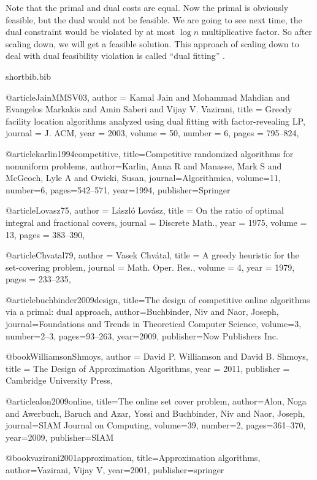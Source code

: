 \documentclass[11pt]{article}
\begin{document}
Note that the primal and dual costs are equal. Now the primal is obviously feasible, but the dual would not be feasible. We are going to see next time, the dual constraint would be violated by at most  $\log n$ multiplicative factor. So after scaling down, we will get a feasible solution. This approach of scaling down to deal with dual feasibility violation is called ``dual fitting'' \cite{JainMMSV03}. 


\begin{filecontents}{shortbib.bib}

@article{JainMMSV03,
  author    = {Kamal Jain and
               Mohammad Mahdian and
               Evangelos Markakis and
               Amin Saberi and
               Vijay V. Vazirani},
  title     = {Greedy facility location algorithms analyzed using dual fitting with
               factor-revealing {LP}},
  journal   = {J. {ACM}},
  year      = {2003},
  volume    = {50},
  number    = {6},
  pages     = {795--824},
}

@article{karlin1994competitive,
  title={Competitive randomized algorithms for nonuniform problems},
  author={Karlin, Anna R and Manasse, Mark S and McGeoch, Lyle A and Owicki, Susan},
  journal={Algorithmica},
  volume={11},
  number={6},
  pages={542--571},
  year={1994},
  publisher={Springer}
}

@article{Lovasz75,
  author    = {L{\'{a}}szl{\'{o}} Lov{\'{a}}sz},
  title     = {On the ratio of optimal integral and fractional covers},
  journal   = {Discrete Math.},
  year      = {1975},
  volume    = {13},
  pages     = {383--390},
}

@article{Chvatal79,
  author = {Vasek Chv\'{a}tal},
  title = {A greedy heuristic for the set-covering problem},
  journal = {Math. Oper. Res.},
  volume = 4,
  year = 1979,
  pages = {233--235},
}
 
@article{buchbinder2009design,
  title={The design of competitive online algorithms via a primal: dual approach},
  author={Buchbinder, Niv and Naor, Joseph},
  journal={Foundations and Trends in Theoretical Computer Science},
  volume={3},
  number={2--3},
  pages={93--263},
  year={2009},
  publisher={Now Publishers Inc.}
}

@book{WilliamsonShmoys,
  author    = {David P. Williamson and
               David B. Shmoys},
  title     = {The Design of Approximation Algorithms},
  year      = {2011},
  publisher = {Cambridge University Press},
}
 
@article{alon2009online,
  title={The online set cover problem},
  author={Alon, Noga and Awerbuch, Baruch and Azar, Yossi and Buchbinder, Niv and Naor, Joseph},
  journal={SIAM Journal on Computing},
  volume={39},
  number={2},
  pages={361--370},
  year={2009},
  publisher={SIAM}
}

@book{vazirani2001approximation,
  title={Approximation algorithms},
  author={Vazirani, Vijay V},
  year={2001},
  publisher={springer}
}

\end{filecontents}


\end{document}
